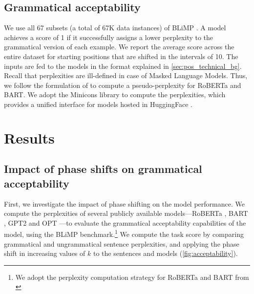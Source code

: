 \documentclass[letterpaper, 12pt]{report}
\begin{document}
\subsection{Grammatical acceptability}
We use all 67 subsets (a total of 67K data instances) of BLiMP \cite{warstadt-etal-2020-blimp}. A model achieves a score of 1 if it successfully assigns a lower perplexity to the grammatical version of each example. We report the average score across the entire dataset for starting positions that are shifted in the intervals of 10.
The inputs are fed to the models in the format explained in \autoref{sec:pos_technical_bg}.
Recall that perplexities are ill-defined in case of Masked Language Models. Thus, we follow the formulation of \citet{salazar2020a} to compute a pseudo-perplexity for RoBERTa and BART.
We adopt the Minicons \cite{misra2022minicons} library to compute the perplexities, which provides a unified interface for models hosted in HuggingFace \citep{huggingface}.




\section{Results}
\label{sec:pos_results}

\subsection{Impact of phase shifts on grammatical acceptability}
\label{sec:pos_acceptability}





First, we investigate the impact of phase shifting on the model performance.
We compute the perplexities of several publicly available models---RoBERTa \citep{liu-et-al-2019-roberta}, BART \citep{lewis-etal-2020-bart}, GPT2 \citep{Radford2019:GPT2} and OPT \citep{Zhang2022:OPT}---to evaluate the grammatical acceptability capabilities of the model, using the BLiMP \cite{warstadt-etal-2020-blimp} benchmark.\footnote{We adopt the perplexity computation strategy for RoBERTa and BART from \citet{salazar2020a}}
We compute the task score by comparing grammatical and ungrammatical sentence perplexities, and applying the phase shift in increasing values of $k$ to the sentences and models (\autoref{fig:acceptability}).
\end{document}
